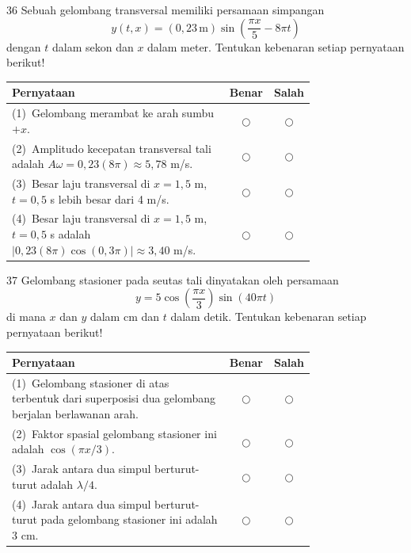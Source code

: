 \documentclass[11pt]{article}
\begin{document}
\begin{soal}{36}  %
Sebuah gelombang transversal memiliki persamaan simpangan
\[
  y(t,x) = (0{,}23\,\text{m})\sin\!\left(\frac{\pi x}{5} - 8\pi t\right)
\]
dengan $t$ dalam sekon dan $x$ dalam meter. Tentukan kebenaran
setiap pernyataan berikut!

\par\smallskip
{\renewcommand{\arraystretch}{1.4}%
\begin{tabular}{@{}p{0.76\linewidth}cc@{}}
\hline
\textbf{Pernyataan} & \textbf{Benar} & \textbf{Salah}\\
\hline
(1)~Gelombang merambat ke arah sumbu $+x$.
  & $\bigcirc$ & $\bigcirc$\\
(2)~Amplitudo kecepatan transversal tali adalah
    $A\omega = 0{,}23(8\pi) \approx 5{,}78$ m/s.
  & $\bigcirc$ & $\bigcirc$\\
(3)~Besar laju transversal di $x=1{,}5$ m, $t=0{,}5$ s lebih besar
    dari 4 m/s.
  & $\bigcirc$ & $\bigcirc$\\
(4)~Besar laju transversal di $x=1{,}5$ m, $t=0{,}5$ s adalah
    $|0{,}23(8\pi)\cos(0{,}3\pi)|\approx 3{,}40$ m/s.
  & $\bigcirc$ & $\bigcirc$\\
\hline
\end{tabular}}
\end{soal}

\begin{soal}{37}  %
Gelombang stasioner pada seutas tali dinyatakan oleh persamaan
\[
  y = 5\cos\!\left(\frac{\pi x}{3}\right)\sin(40\pi t)
\]
di mana $x$ dan $y$ dalam cm dan $t$ dalam detik. Tentukan
kebenaran setiap pernyataan berikut!

\par\smallskip
{\renewcommand{\arraystretch}{1.4}%
\begin{tabular}{@{}p{0.76\linewidth}cc@{}}
\hline
\textbf{Pernyataan} & \textbf{Benar} & \textbf{Salah}\\
\hline
(1)~Gelombang stasioner di atas terbentuk dari superposisi dua
    gelombang berjalan berlawanan arah.
  & $\bigcirc$ & $\bigcirc$\\
(2)~Faktor spasial gelombang stasioner ini adalah $\cos(\pi x/3)$.
  & $\bigcirc$ & $\bigcirc$\\
(3)~Jarak antara dua simpul berturut-turut adalah $\lambda/4$.
  & $\bigcirc$ & $\bigcirc$\\
(4)~Jarak antara dua simpul berturut-turut pada gelombang
    stasioner ini adalah 3 cm.
  & $\bigcirc$ & $\bigcirc$\\
\hline
\end{tabular}}
\end{soal}
\end{document}
